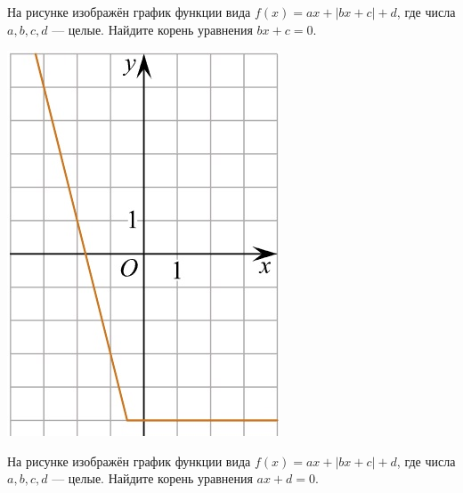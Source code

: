 \begin{class}[number=5]
\begin{listofex}
\begin{minipage}[c]{0.1\textwidth}
		\end{minipage}
		\item
		\begin{minipage}[t]{0.43\textwidth}
			На рисунке изображён график функции вида \(f(x)=ax+|bx+c|+d\), где числа \(a, b, c, d\) --- целые. Найдите корень уравнения \(bx+c=0\).
		\end{minipage}
		\begin{minipage}[c]{0.1\textwidth}
			\includegraphics[align=t, width=\textwidth]{pics/G111M4C5-5.jpg}
		\end{minipage}
		\item
		\begin{minipage}[t]{0.43\textwidth}
			На рисунке изображён график функции вида \(f(x)=ax+|bx+c|+d\), где числа \(a, b, c, d\) --- целые. Найдите корень уравнения \(ax+d=0\).
		\end{minipage}
		\begin{minipage}[c]{0.1\textwidth}

\end{minipage}
\end{listofex}
\end{class}
